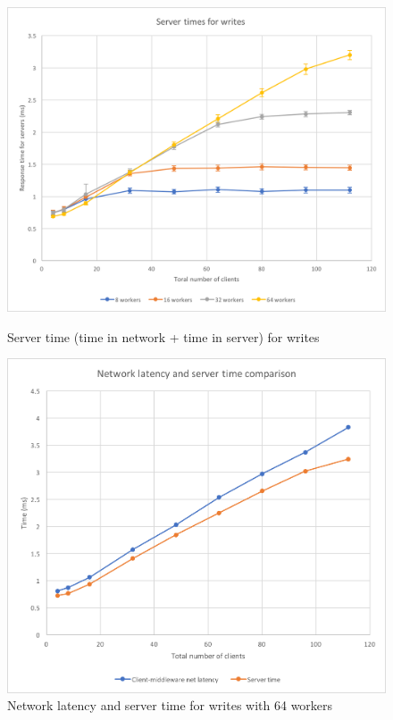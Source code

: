 \documentclass[11pt,a4paper]{article}
\begin{document}
\begin{figure}[!h]
    \centering
    \begin{minipage}[b]{.45\textwidth}
        \centering
        \includegraphics[width=\textwidth]{processing/graphics/bench_1mw_st_writes.png}
        \caption{Server time (time in network + time in server) for writes}
        \label{png::bench_1mw_st_writes}
    \end{minipage}
    \qquad
    \begin{minipage}[b]{.45\textwidth}
        \centering
        \includegraphics[width=\textwidth]{processing/graphics/bench_1mw_netlat_st_64writes.png}
        \caption{Network latency and server time for writes with 64 workers}
        \label{png::bench_1mw_netlat_st_64writes}
    \end{minipage}
\end{figure}
\end{document}
